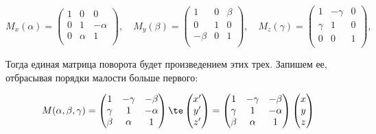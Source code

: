 \documentclass[12pt]{kiarticle}
\begin{document}
\begin{equation}\label{}
M_x(\alpha) =
\begin{pmatrix}
1 & 0 & 0  \\
0 & 1 & -\alpha  \\ 
0 & \alpha & 1  \\
\end{pmatrix}, \quad
M_y(\beta) =
\begin{pmatrix}
1 & 0 & \beta  \\
0 & 1 & 0  \\ 
-\beta & 0 & 1  \\
\end{pmatrix}, \quad
M_z(\gamma) =
\begin{pmatrix}
1 & -\gamma & 0  \\
\gamma & 1 & 0  \\ 
0 & 0 & 1  \\
 \end{pmatrix}, \quad
\end{equation}

Тогда единая матрица поворота будет произведением этих трех. Запишем ее, отбрасывая порядки малости больше первого: 

\begin{equation}\label{}
M(\alpha, \beta, \gamma) = \begin{pmatrix}
1 & -\gamma & -\beta  \\
\gamma & 1 & -\alpha  \\ 
\beta & \alpha & 1  \\
\end{pmatrix}
\te 
\begin{pmatrix}
x' \\
y' \\
z'
\end{pmatrix}
=
\begin{pmatrix}
1 & -\gamma & -\beta  \\
\gamma & 1 & -\alpha  \\ 
\beta & \alpha & 1  \\
\end{pmatrix}
\begin{pmatrix}
x \\
y \\
z
\end{pmatrix}
\end{equation}
\end{document}
